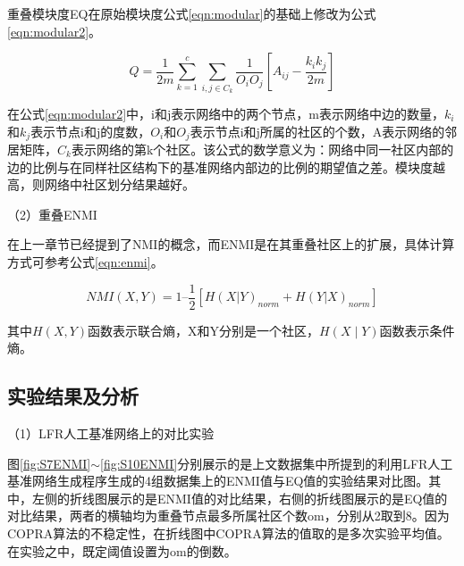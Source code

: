 重叠模块度EQ\cite{Lancichinetti2010Finding}在原始模块度公式\ref{eqn:modular}的基础上修改为公式\ref{eqn:modular2}。

\begin{equation}
  \label{eqn:modular2}
  Q=\frac{1}{2m} \sum_{k=1}^c \sum_{i,j \in C_k} \frac{1}{O_iO_j} \left [ A_{ij}-\frac{k_ik_j}{2m} \right ]  
\end{equation}

在公式\ref{eqn:modular2}中，i和j表示网络中的两个节点，m表示网络中边的数量，$k_i$和$k_j$表示节点i和j的度数，$O_i$和$O_j$表示节点i和j所属的社区的个数，A表示网络的邻居矩阵，$C_k$表示网络的第k个社区。该公式的数学意义为：网络中同一社区内部的边的比例与在同样社区结构下的基准网络内部边的比例的期望值之差。模块度越高，则网络中社区划分结果越好。

（2）重叠ENMI

在上一章节已经提到了NMI的概念，而ENMI\cite{Lancichinetti2009Detecting}是在其重叠社区上的扩展，具体计算方式可参考公式\ref{eqn:enmi}。

\begin{equation}
  \label{eqn:enmi}
  NMI(X,Y) = 1 – \frac{1}{2} [H(X|Y)_{norm} + H(Y|X)_{norm}]
\end{equation}

其中$H(X,Y)$函数表示联合熵，X和Y分别是一个社区，$H(X \mid Y)$函数表示条件熵。

\subsection{实验结果及分析}

（1）LFR人工基准网络上的对比实验

图\ref{fig:S7ENMI}$\sim$\ref{fig:S10ENMI}分别展示的是上文数据集中所提到的利用LFR人工基准网络生成程序生成的4组数据集上的ENMI值与EQ值的实验结果对比图。其中，左侧的折线图展示的是ENMI值的对比结果，右侧的折线图展示的是EQ值的对比结果，两者的横轴均为重叠节点最多所属社区个数om，分别从2取到8。因为COPRA算法的不稳定性，在折线图中COPRA算法的值取的是多次实验平均值。在实验之中，既定阈值设置为om的倒数。

